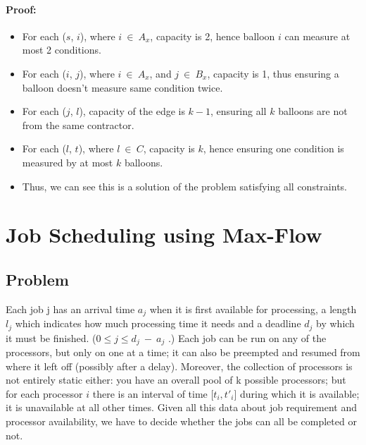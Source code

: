 \documentclass[pdftex,a4paper,12pt]{report}
\begin{document}
\begin{itemize}
\paragraph{Proof:}
\begin{itemize}
\item For each ($s$, $i$), where $i\ \in\ A_x$, capacity is 2, hence balloon $i$ can measure at most 2 conditions.
\item For each ($i$, $j$), where $i\ \in\ A_x$, and $j\ \in\ B_x$, capacity is 1, thus ensuring a balloon doesn't measure same condition twice.
\item For each ($j$, $l$), capacity of the edge is $k-1$, ensuring all $k$ balloons are not from the same contractor.
\item For each ($l$, $t$), where $l\ \in\ C$, capacity is $k$, hence ensuring one condition is measured by at most $k$ balloons.
\item Thus, we can see this is a solution of the problem satisfying all constraints.
\end{itemize}
\end{itemize}
\newpage

\section{Job Scheduling using Max-Flow}
\subsection{Problem}
Each job j has an arrival time $a_j$ when it is first available
for processing, a length $l_j$ which indicates how much processing time it needs and a deadline $d_j$ by which it must be finished. ($0 \leq j \leq d_j\ -\ a_j$ .) Each job can be run on any of the
processors, but only on one at a time; it can also be preempted and resumed from where it left off (possibly after a delay).
Moreover, the collection of processors is not entirely static either: you have an overall pool of k possible
processors; but for each processor $i$ there is an interval of time [$t_i, t'_i$] during which it is available; it is unavailable at all other times.
Given all this data about job requirement and processor availability, we have to decide whether the jobs can all be completed or not. 
\end{document}
